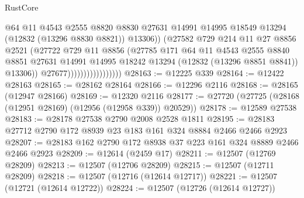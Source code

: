 \begin{lexlean}{RustCore}
\begin{coremodule}
                                        @64
                                        @11
                                        @4543
                                        @2555
                                        @8820
                                        @8830
                                        @27631
                                        @14991
                                        @14995
                                        @18549
                                        @13294
                                        (@12832 (@13296 @8830 @8821))
                                        @13306))
                                    (@27582
                                      @729
                                      @214
                                      @11
                                      @27
                                      @8856
                                      @2521
                                      (@27722
                                        @729
                                        @11
                                        @8856
                                        (@27785
                                          @171
                                          @64
                                          @11
                                          @4543
                                          @2555
                                          @8840
                                          @8851
                                          @27631
                                          @14991
                                          @14995
                                          @18242
                                          @13294
                                          (@12832 (@13296 @8851 @8841))
                                          @13306))
                                      @27677)))))))))))))))))
@28163 := @12225 @339
@28164 := @12422 @28163
@28165 := @28162 @28164
@28166 := @12296 @2116
@28168 := @28165 (@12947 @28166)
@28169 := @12320 @2116
@28177 := @27720 (@27725 (@28168 (@12951 @28169) (@12956 (@12958 @339)) @20529))
@28178 := @12589 @27538
@28183 := @28178 @27538 @2790 @2008 @2528 @1811
@28195 := @28183 @27712 @2790 @172 @8939 @23 @183 @161 @324 @8884 @2466 @2466 @2923
@28207 := @28183 @162 @2790 @172 @8938 @37 @223 @161 @324 @8889 @2466 @2466 @2923
@28209 := @12614 (@2459 @17)
@28211 := @12507 (@12769 @28209)
@28213 := @12507 (@12706 @28209)
@28215 := @12507 (@12711 @28209)
@28218 := @12507 (@12716 (@12614 @12717))
@28221 := @12507 (@12721 (@12614 @12722))
@28224 := @12507 (@12726 (@12614 @12727))

\end{coremodule}
\end{lexlean}
